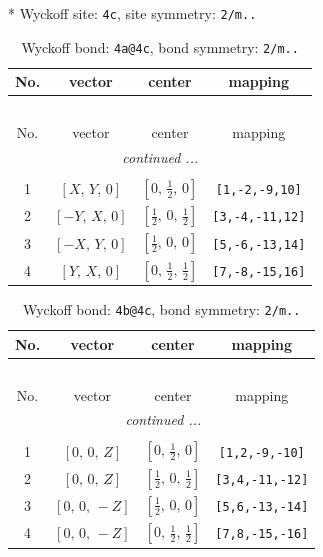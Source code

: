 \documentclass[fleqn,8pt]{jsarticle}
\begin{document}
* Wyckoff site: {\tt 4c}, site symmetry: {\tt 2/m..}
\renewcommand{\arraystretch}{1.2}
\begin{longtable}{cccc}
\caption{Wyckoff bond: {\tt 4a@4c}, bond symmetry: {\tt 2/m..}}
 \\
 \hline \hline
No. & vector & center & mapping \\ \hline \endfirsthead

\multicolumn{3}{l}{\tablename\ \thetable{}} \\
 \hline \hline
No. & vector & center & mapping \\ \hline \endhead

 \hline \hline
\multicolumn{3}{r}{\footnotesize\it continued ...} \\ \endfoot

 \hline \hline
\multicolumn{3}{r}{} \\ \endlastfoot

1 & $\left[ X,\, Y,\, 0 \right]$ & $\left[ 0,\, \frac{1}{2},\, 0 \right]$ & {\tt [1,-2,-9,10]} \\ \hline
2 & $\left[ - Y,\, X,\, 0 \right]$ & $\left[ \frac{1}{2},\, 0,\, \frac{1}{2} \right]$ & {\tt [3,-4,-11,12]} \\ \hline
3 & $\left[ - X,\, Y,\, 0 \right]$ & $\left[ \frac{1}{2},\, 0,\, 0 \right]$ & {\tt [5,-6,-13,14]} \\ \hline
4 & $\left[ Y,\, X,\, 0 \right]$ & $\left[ 0,\, \frac{1}{2},\, \frac{1}{2} \right]$ & {\tt [7,-8,-15,16]} \\
\end{longtable}
\renewcommand{\arraystretch}{1.2}
\begin{longtable}{cccc}
\caption{Wyckoff bond: {\tt 4b@4c}, bond symmetry: {\tt 2/m..}}
 \\
 \hline \hline
No. & vector & center & mapping \\ \hline \endfirsthead

\multicolumn{3}{l}{\tablename\ \thetable{}} \\
 \hline \hline
No. & vector & center & mapping \\ \hline \endhead

 \hline \hline
\multicolumn{3}{r}{\footnotesize\it continued ...} \\ \endfoot

 \hline \hline
\multicolumn{3}{r}{} \\ \endlastfoot

1 & $\left[ 0,\, 0,\, Z \right]$ & $\left[ 0,\, \frac{1}{2},\, 0 \right]$ & {\tt [1,2,-9,-10]} \\ \hline
2 & $\left[ 0,\, 0,\, Z \right]$ & $\left[ \frac{1}{2},\, 0,\, \frac{1}{2} \right]$ & {\tt [3,4,-11,-12]} \\ \hline
3 & $\left[ 0,\, 0,\, - Z \right]$ & $\left[ \frac{1}{2},\, 0,\, 0 \right]$ & {\tt [5,6,-13,-14]} \\ \hline
4 & $\left[ 0,\, 0,\, - Z \right]$ & $\left[ 0,\, \frac{1}{2},\, \frac{1}{2} \right]$ & {\tt [7,8,-15,-16]} \\
\end{longtable}
\end{document}

